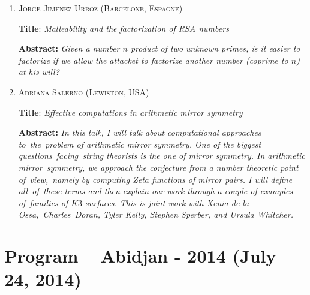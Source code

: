 \documentclass[a4paper,10pt]{article}
\begin{document}
\begin{enumerate}
\item \textsc{Jorge Jimenez Urroz (Barcelone, Espagne)}\medskip

\textbf{Title}: \textit{Malleability and the factorization of RSA numbers}

\textbf{Abstract:} \textit{Given a number $n$ product of two unknown primes, is it easier to factorize 
if we allow the attacket to factorize another number (coprime to $n$) at his will?}\bigskip

\item \textsc{Adriana Salerno (Lewiston, USA)}\medskip

\textbf{Title}: \textit{Effective computations in arithmetic mirror symmetry}

\textbf{Abstract:} \textit{In this talk, I will talk about computational approaches to the problem of arithmetic mirror symmetry. 
One of the biggest questions facing string theorists is the one of mirror symmetry. In arithmetic mirror symmetry, 
we approach the conjecture from a number theoretic point of view, namely by computing Zeta functions of mirror pairs. 
I will define all of these terms and then explain our work through a couple of examples of families of $K3$ surfaces. 
This is joint work with Xenia de la Ossa, Charles Doran, Tyler Kelly, Stephen Sperber, and Ursula Whitcher. }
\end{enumerate}


\section{Program – Abidjan - 2014 (July 24, 2014)}
\end{document}
